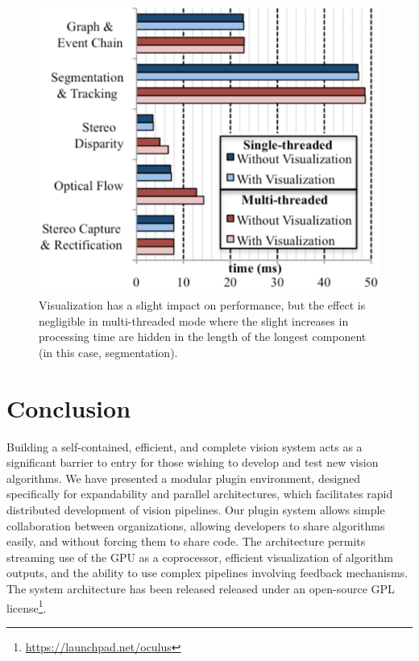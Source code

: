 \begin{figure}[t]
\begin{center}
   \includegraphics[width=0.5\linewidth]{TimingGraph.pdf}
\end{center}
   \caption{Visualization has a slight impact on performance, but the effect is negligible in multi-threaded mode where the slight increases in processing time are hidden in the length of the longest component (in this case, segmentation).}
\label{fig:TestVis}
\end{figure}


\section{Conclusion}
Building a self-contained, efficient, and complete vision system acts as a significant barrier to entry for those wishing to develop and test new vision algorithms. We have presented a modular plugin environment, designed specifically for expandability and parallel architectures, which facilitates rapid distributed development of vision pipelines. Our plugin system allows simple collaboration between organizations, allowing developers to share algorithms easily, and without forcing them to share code. The architecture permits streaming use of the GPU as a coprocessor, efficient visualization of algorithm outputs, and the ability to use complex pipelines involving feedback mechanisms. The system architecture has been released released under an open-source GPL license\footnote{\url{https://launchpad.net/oculus}}.